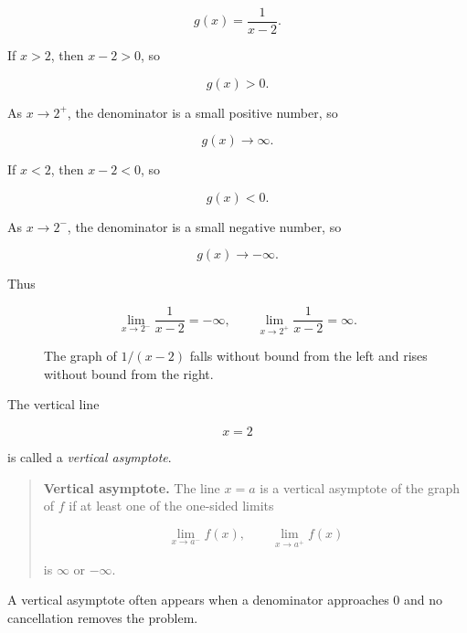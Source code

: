 \[
g(x)=\frac{1}{x-2}.
\]

If \(x>2\), then \(x-2>0\), so

\[
g(x)>0.
\]

As \(x\to2^+\), the denominator is a small positive number, so

\[
g(x)\to\infty.
\]

If \(x<2\), then \(x-2<0\), so

\[
g(x)<0.
\]

As \(x\to2^-\), the denominator is a small negative number, so

\[
g(x)\to-\infty.
\]

Thus

\[
\lim_{x\to2^-}\frac1{x-2}=-\infty,
\qquad
\lim_{x\to2^+}\frac1{x-2}=\infty.
\]

\begin{figure}[h]
\centering
{}
\caption{The graph of \(1/(x-2)\) falls without bound from the left and rises without bound from the right.}
\label{fig:one-over-x-minus-two}
\end{figure}

The vertical line

\[
x=2
\]

is called a \emph{vertical asymptote}.

\begin{quote}
\textbf{Vertical asymptote.}
The line \(x=a\) is a vertical asymptote of the graph of \(f\) if at least one of the one-sided limits

\[
\lim_{x\to a^-}f(x),
\qquad
\lim_{x\to a^+}f(x)
\]

is \(\infty\) or \(-\infty\).
\end{quote}

A vertical asymptote often appears when a denominator approaches \(0\) and no cancellation removes the problem.


